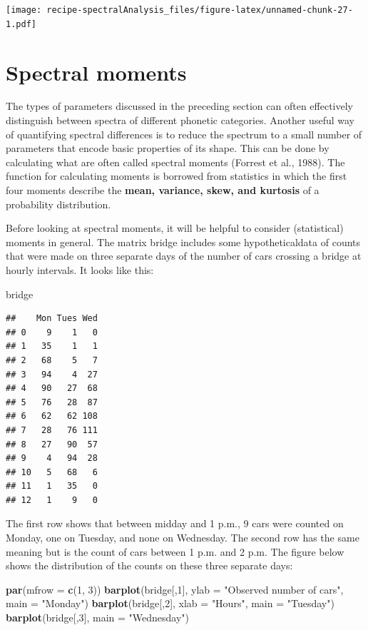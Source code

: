 \documentclass[]{book}
\newenvironment{Shaded}{\begin{snugshade}}{\end{snugshade}}
\newcommand{\DataTypeTok}[1]{\textcolor[rgb]{0.13,0.29,0.53}{#1}}
\newcommand{\DecValTok}[1]{\textcolor[rgb]{0.00,0.00,0.81}{#1}}
\newcommand{\KeywordTok}[1]{\textcolor[rgb]{0.13,0.29,0.53}{\textbf{#1}}}
\newcommand{\NormalTok}[1]{#1}
\newcommand{\StringTok}[1]{\textcolor[rgb]{0.31,0.60,0.02}{#1}}
\begin{document}
\texttt{[image: recipe-spectralAnalysis\_files/figure-latex/unnamed-chunk-27-1.pdf]}

\hypertarget{spectral-moments}{%
\section{Spectral moments}\label{spectral-moments}}

The types of parameters discussed in the preceding section can often effectively distinguish between spectra of different phonetic categories. Another useful way of quantifying spectral differences is to reduce the spectrum to a small number of parameters that encode basic properties of its shape. This can be done by calculating what are often called spectral moments (Forrest et al., 1988). The function for calculating moments is borrowed from statistics in which the first four moments describe the \textbf{mean, variance, skew, and kurtosis} of a probability distribution.

Before looking at spectral moments, it will be helpful to consider
(statistical) moments in general. The matrix bridge includes some hypotheticaldata of counts that were made on three separate days of the number of cars crossing a bridge at hourly intervals. It looks like this:

\begin{Shaded}
\begin{Highlighting}[]
\NormalTok{bridge}
\end{Highlighting}
\end{Shaded}

\begin{verbatim}
##    Mon Tues Wed
## 0    9    1   0
## 1   35    1   1
## 2   68    5   7
## 3   94    4  27
## 4   90   27  68
## 5   76   28  87
## 6   62   62 108
## 7   28   76 111
## 8   27   90  57
## 9    4   94  28
## 10   5   68   6
## 11   1   35   0
## 12   1    9   0
\end{verbatim}

The first row shows that between midday and 1 p.m., 9 cars were counted on
Monday, one on Tuesday, and none on Wednesday. The second row has the same
meaning but is the count of cars between 1 p.m. and 2 p.m. The figure below shows the distribution of the counts on these three separate days:

\begin{Shaded}
\begin{Highlighting}[]
\KeywordTok{par}\NormalTok{(}\DataTypeTok{mfrow =} \KeywordTok{c}\NormalTok{(}\DecValTok{1}\NormalTok{, }\DecValTok{3}\NormalTok{)) }
\KeywordTok{barplot}\NormalTok{(bridge[,}\DecValTok{1}\NormalTok{], }
        \DataTypeTok{ylab =} \StringTok{"Observed number of cars"}\NormalTok{, }
        \DataTypeTok{main =} \StringTok{"Monday"}\NormalTok{) }
\KeywordTok{barplot}\NormalTok{(bridge[,}\DecValTok{2}\NormalTok{], }
        \DataTypeTok{xlab =} \StringTok{"Hours"}\NormalTok{,}
        \DataTypeTok{main =} \StringTok{"Tuesday"}\NormalTok{) }
\KeywordTok{barplot}\NormalTok{(bridge[,}\DecValTok{3}\NormalTok{], }
        \DataTypeTok{main =} \StringTok{"Wednesday"}\NormalTok{) }
\end{Highlighting}
\end{Shaded}
\end{document}
